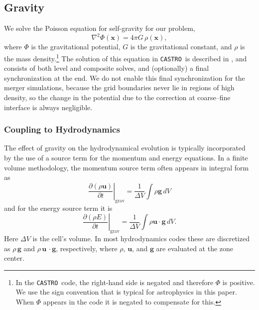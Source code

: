 \documentclass[iop,numberedappendix]{../emulateapj}
\newcommand{\castro}{\texttt{CASTRO}}
\begin{document}
\subsection{Gravity}
\label{sec:gravity}

We solve the Poisson equation for self-gravity for our problem,
\begin{equation}
  \nabla^2 \Phi(\mathbf{x}) = 4\pi G\, \rho(\mathbf{x}),
\end{equation}
where $\Phi$ is the gravitational potential, $G$ is the gravitational
constant, and $\rho$ is the mass density.\footnote{In the \castro\ code, the 
right-hand side is negated and therefore $\Phi$ is positive. We use the 
sign convention that is typical for astrophysics in this paper. 
When $\Phi$ appears in the code it is negated to compensate for this.} 
The solution of this equation in \castro\ is described in \cite{castro}, and
consists of both level and composite solves, and (optionally) a final
synchronization at the end. We do not enable this final synchronization
for the merger simulations, because the grid boundaries never lie in
regions of high density, so the change in the potential due to the correction
at coarse--fine interface is always negligible.

\subsubsection{Coupling to Hydrodynamics}\label{sec:gravity_hydro_coupling}

The effect of gravity on the hydrodynamical evolution is typically
incorporated by the use of a source term for the momentum and energy
equations. In a finite volume methodology, the momentum source term 
often appears in integral form as
\begin{equation}
  \left.\frac{\partial (\rho \mathbf{u})}{\partial t}\right|_{\text{grav}} = \frac{1}{\Delta V} \int \rho \mathbf{g}\, dV
\end{equation}
and for the energy source term it is
\begin{equation}
  \left.\frac{\partial (\rho E)}{\partial t}\right|_{\text{grav}} = \frac{1}{\Delta V} \int \rho \mathbf{u}\cdot\mathbf{g}\, dV \label{eq:cell_center_gravity_source}.
\end{equation}
Here $\Delta V$ is the cell's volume.
In most hydrodynamics codes these are discretized as $\rho\,
\mathbf{g}$ and $\rho\, \mathbf{u}\,\cdot\mathbf{g}$, respectively, 
where $\rho$, $\mathbf{u}$, and $\mathbf{g}$ 
are evaluated at the zone center. 
\end{document}
